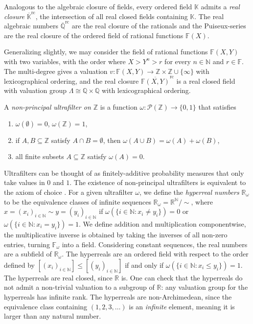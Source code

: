 \documentclass[12pt]{amsart}
\newcommand{\F}{\mathbb{F} }
\newcommand{\R}{\mathbb{R} }
\newcommand{\Q}{\mathbb{Q} }
\newcommand{\N}{\mathbb{N} }
\newcommand{\Z}{\mathbb{Z} }
\newcommand{\K}{\mathbb{K}}
\numberwithin{equation}{section}
\theoremstyle{remark} %
\begin{document}
Analogous to the algebraic closure of fields, every ordered field $\K$ admits a \emph{real closure} $\overline{\K}^{\operatorname{rc}}$, the intersection of all real closed fields containing $\K$. The real algebraic numbers $\overline{\Q}^{\operatorname{rc}}$ are the real closure of the rationals and the Puiseux-series are the real closure of the ordered field of rational functions $\F(X)$. 

Generalizing slightly, we may consider the field of rational functions $\F(X,Y)$ with two variables, with the order where $X> Y^n> r$ for every $n\in \N$ and $r\in \F$. The multi-degree gives a valuation $ v \colon \F(X,Y) \to \Z \times \Z \cup \{\infty\}$ with lexicographical ordering, and the real closure $\overline{\F(X,Y)}^{\operatorname{rc}}$ is a real closed field with valuation group $\Lambda \cong \Q \times \Q$ with lexicographical ordering. 
 
 A \emph{non-principal ultrafilter on $\Z$} is a function $\omega \colon \mathcal{P}(\Z) \to \{0,1\}$ that satisfies
 \begin{enumerate}
 	\item [(1)] $\omega(\emptyset) = 0$, $\omega(\Z) = 1$,
 	\item [(2)] if $A,B \subseteq \Z$ satisfy $A\cap B = \emptyset$, then $\omega(A \cup B) = \omega(A) + \omega(B)$,
 	\item [(3)] all finite subsets $A \subseteq \Z$ satisfy $\omega(A) = 0$.
 \end{enumerate}
 Ultrafilters can be thought of as finitely-additive probability measures that only take values in $0$ and $1$. The existence of non-principal ultrafilters is equivalent to the axiom of choice \cite{Hal}. For a given ultrafilter $\omega$, we define the \emph{hyperreal numbers} $\R_{\omega}$ to be the equivalence classes of infinite sequences $\R_{\omega} = \R^{\N}/ \!\! \sim$, where $x = (x_i)_{i \in \N} \sim y = (y_i)_{i \in \N}$ if $\omega(\{ i \in \N \colon x_i \neq y_i\}) = 0$ or $\omega(\{ i \in \N \colon x_i = y_i\}) = 1$. We define addition and multiplication componentwise, the multiplicative inverse is obtained by taking the inverses of all non-zero entries, turning $\F_\omega$ into a field. Considering constant sequences, the real numbers are a subfield of $\R_\omega$. The hyperreals are an ordered field with respect to the order defined by $[(x_i)_{i\in \N}] \leq [(y_i)_{i \in \N} ]$ if and only if $\omega(\{i \in \N \colon x_i \leq y_i\}) = 1$. The hyperreals are real closed, since $\R$ is. One can check that the hyperreals do not admit a non-trivial valuation to a subgroup of $\R$: any valuation group for the hyperreals has infinite rank. The hyperreals are non-Archimedean, since the equivalence class containing $(1, 2, 3, \ldots)$ is an \emph{infinite} element, meaning it is larger than any natural number. 
 
\end{document}
